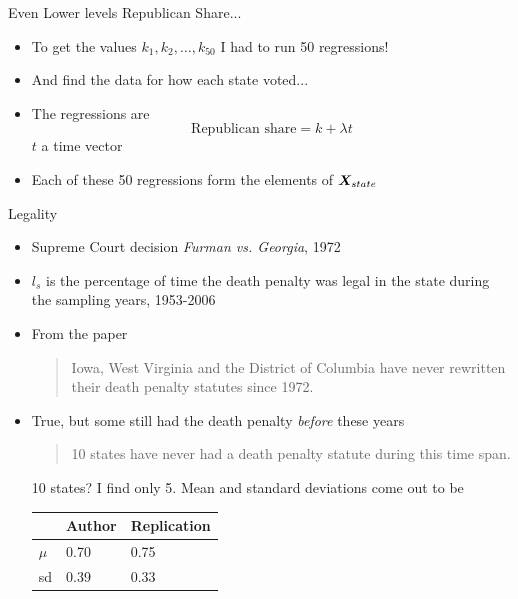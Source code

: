 \documentclass{beamer}
\begin{document}
	\begin{frame}{Even Lower levels}
		Republican Share...
		\begin{itemize}
			\item To get the values $ k_1, k_2, \dots, k_{50} $ I had to run 50 regressions! 
			\item And find the data for how each state voted...
									\item The regressions are \[ \text{Republican share} = k + \lambda t \] $ t $ a time vector 
									\item Each of these 50 regressions form the elements of $ \bm{X_}{state }$
		\end{itemize}
	\end{frame}
	
	\begin{frame}{Legality}
		\begin{itemize}
			\item Supreme Court decision \textit{Furman vs. Georgia}, 1972
			\item $ l_s $ is the percentage of time the death penalty was legal in the state during the sampling years, 1953-2006
			\item From the paper \begin{quotation}
				Iowa, West Virginia and the District of Columbia have never rewritten their death penalty statutes since 1972.
			\end{quotation}
			\item True, but some still had the death penalty \textit{before} these years
			\begin{quotation}
				10 states have never had a death penalty statute during this time span.
			\end{quotation}
			10 states? I find only 5. Mean and standard deviations come out to be 
			\begin{table}
				\begin{tabular}{lll}
					& Author & Replication \\
					\hline 
					\hline 
					$ \mu $& 0.70 & 0.75 \\
					sd & 0.39 & 0.33 \\
					\hline 
				\end{tabular}
			\end{table}
			
		\end{itemize}
	\end{frame}
	
\end{document}

